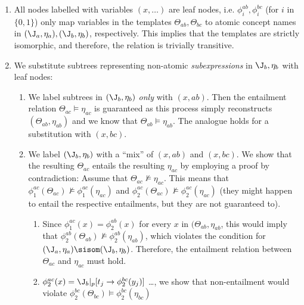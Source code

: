 \begin{enumerate}
\item All nodes labelled with variables $(x,\ldots)$ are leaf nodes, i.e. $\phi^{ab}_{i}, \phi^{bc}_{i}$ (for $i$ in $\{0,1\}$) only map variables in the templates $\Theta_{ab}, \Theta_{bc}$ to atomic concept names in $(\J_{a}, \eta_{a}), (\J_{b}, \eta_{b})$, respectively. This implies that the templates are strictly isomorphic, and therefore, the relation is trivially transitive.

\item We substitute subtrees representing non-atomic \emph{subexpressions} in $\J_{b}, \eta_{b}$ with leaf nodes: 

\begin{enumerate}

\item We label subtrees in $(\J_{b}, \eta_{b})$ \emph{only} with $(x, ab)$. Then the entailment relation $\Theta_{ac} \models \eta_{ac}$ is guaranteed as this process simply reconstructs $(\Theta_{ab}, \eta_{ab})$  and we know that $\Theta_{ab} \models \eta_{ab}$. The analogue holds for a substitution with $(x, bc)$.

\item We label $(\J_{b}, \eta_{b})$ with a \enquote{mix} of $(x, ab)$ and $(x, bc)$. We show that the resulting $\Theta_{ac}$ entails the resulting $\eta_{ac}$ by employing a proof by contradiction: Assume that $\Theta_{ac} \not\models \eta_{ac}$. This means that $\phi^{ac}_{1}(\Theta_{ac}) \not\models \phi^{ac}_{1}(\eta_{ac})$ and $\phi^{ac}_{2}(\Theta_{ac}) \not\models \phi^{ac}_{2}(\eta_{ac})$ (they might happen to entail the respective entailments, but they are not guaranteed to).

\begin{enumerate}
\item Since $\phi^{ac}_{1}(x) = \phi^{ab}_{2}(x)$ for every $x$ in $(\Theta_{ab}, \eta_{ab}$, this would imply that $\phi^{ab}_{2}(\Theta_{ab})  \not\models \phi^{ab}_{2}(\eta_{ab})$, which violates the condition for $(\J_{a}, \eta_{a}) \sisom (\J_{b}, \eta_{b}) $. Therefore, the entailment relation between $\Theta_{ac}$ and $\eta_{ac}$ must hold.
\item $\phi^{ac}_{2}(x) = \J_{b}|_{p} [t_{j} \rightarrow \phi^{bc}_{2}(y_{j})]$ \ldots, we show that non-entailment would violate $\phi^{bc}_{2}(\Theta_{bc})  \models \phi^{bc}_{2}(\eta_{bc})$ 

\end{enumerate}

\end{enumerate}
\end{enumerate}



